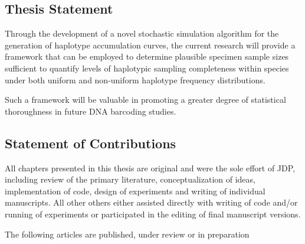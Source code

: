 \subsection{Thesis Statement}

Through the development of a novel stochastic simulation algorithm for the generation of haplotype accumulation curves, the current research will provide a framework that can be employed to determine plausible specimen sample sizes sufficient to quantify levels of haplotypic sampling completeness within species under both uniform and non-uniform haplotype frequency distributions.

\vspace{5mm}

Such a framework will be valuable in promoting a greater degree of statistical \\ thoroughness in future DNA barcoding studies. 

\vspace{5mm}

\subsection{Statement of Contributions}
  
All chapters presented in this thesis are original and were the sole effort of JDP, \\ including review of the primary literature, conceptualization of ideas, implementation of code, design of experiments and writing of individual manuscripts. All other others either assisted directly with writing of code and/or running of experiments or participated in the editing of final manuscript versions.

\vspace{5mm}

The following articles are published, under review or in preparation


